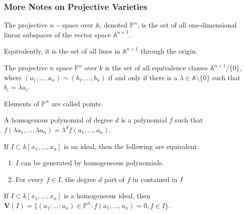 \documentclass[crop=false,class=article,oneside]{standalone}
\begin{document}
        \subsubsection{More Notes on Projective Varieties}
            \begin{definition}
                The projective $n-$space over $\mathbb{A}$,
                denoted $\mathbb{P}^{n}$, is the set of all
                one-dimensional linear subspaces of the vector
                space $\mathbb{A}^{n+1}$.
            \end{definition}
            \begin{remark}
                Equivalently, it is the set of all lines
                in $\mathbb{A}^{n+1}$ through the origin.
            \end{remark}
            \begin{definition}
                The projective $n$ space $\mathbb{P}^{n}$ over $k$
                is the set of all equivalence classes
                $\mathbb{A}^{n+1}/\{0\}$, where
                $(a_{1},\hdots,a_{n})\sim(b_{1},\hdots,b_{n})$
                if and only if there is a
                $\lambda\in\mathbb{A}\setminus\{0\}$
                such that $b_{i}=\lambda{a_{i}}$.
            \end{definition}
            \begin{remark}
                Elements of $\mathbb{P}^{n}$ are called points.
            \end{remark}
            \begin{definition}
                A homogenous polynomial of degree $d$
                is a polynomial $f$ such that
                $f(\lambda a_1,\hdots,\lambda a_n)%
                 =\lambda^d f(a_1,\hdots, a_n)$.
            \end{definition}
            \begin{theorem}
                If $I\subset k[x_1,\hdots ,x_n]$ is an ideal,
                then the following are equivalent:
                \begin{enumerate}
                    \item $I$ can be generated by
                          homogeneous polynomials.
                    \item For every $f\in I$, the degree
                          $d$ part of $f$ in contained in $I$
                \end{enumerate}
            \end{theorem}
            \begin{definition}
                If $I\subset k[x_1,\hdots ,x_n]$ is a
                homogeneous ideal, then
                $\mathbf{V}(I)%
                 =\{(a_1:\hdots:a_{n})\in\mathbb{P}^{n}:%
                 f(a_{1},\hdots,a_{n})=0,f\in I\}$.
            \end{definition}
\end{document}
